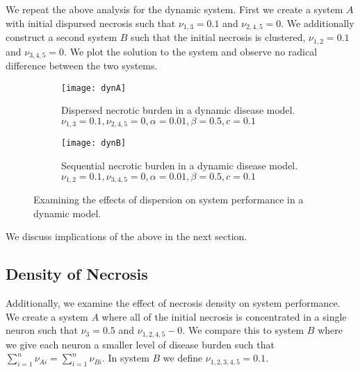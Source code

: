 \documentclass[11pt]{report}
\begin{document}
We repeat the above analysis for the dynamic system. First we create a system $A$ with initial dispursed necrosis such that $\nu_{1,3} = 0.1$ and $\nu_{2,4,5} = 0$. We additionally construct a second system $B$ such that the initial necrosis is clustered, $\nu_{1,2} = 0.1$ and $\nu_{3,4,5} = 0$. We plot the solution to the system and observe no radical difference between the two systems.

\begin{figure}
    \centering
    \begin{subfigure}[b]{0.48\textwidth}
        \texttt{[image: dynA]}
        \caption{Dispersed necrotic burden in a dynamic disease model. $\nu_{1,3} = 0.1, \nu_{2,4,5} = 0, \alpha = 0.01, \beta = 0.5,c = 0.1$}
        \label{fig:statA}
    \end{subfigure}
    \hfill %
    \begin{subfigure}[b]{0.48\textwidth}
        \texttt{[image: dynB]}
        \caption{Sequential necrotic burden in a dynamic disease model. $\nu_{1,2} = 0.1, \nu_{3,4,5} = 0, \alpha = 0.01, \beta = 0.5,c = 0.1$}
        \label{fig:statB}
    \end{subfigure}
    \caption{Examining the effects of dispersion on system performance in a dynamic model. }\label{fig:dispersion}
\end{figure}

We discuss implications of the above in the next section. 


\subsection{Density of Necrosis} %
\label{sub:density_of_necrosis}


Additionally, we examine the effect of necrosis density on system performance. We create a system $A$ where all of the initial necrosis is concentrated in a single neuron such that $\nu_3 = 0.5$ and $\nu_{1,2,4,5} - 0$. We compare this to system $B$ where we give each neuron a smaller level of disease burden such that $\sum^n_{i=1} \nu_{Ai} = \sum^n_{i=1} \nu_{Bi}$. In system $B$ we define $\nu_{1,2,3,4,5} = 0.1$.
\end{document}
